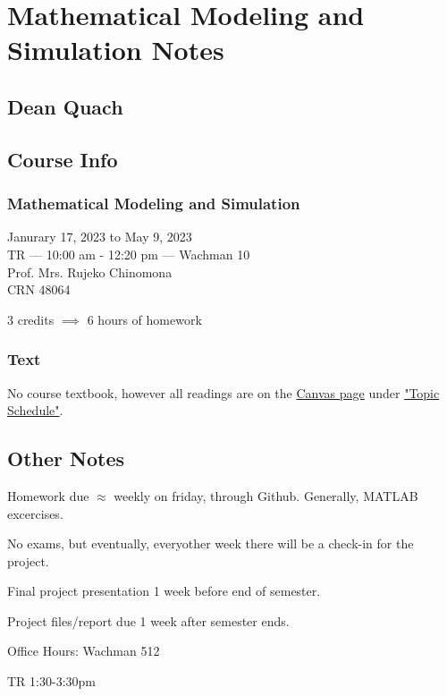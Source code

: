 \documentclass[12pt]{book}
\begin{document}
\frontmatter
%
\chapter*{\Huge \center Mathematical Modeling and Simulation Notes}
\thispagestyle{empty}
\section*{\huge \center Dean Quach}



\newpage
\section*{\center \normalsize Course Info}
\subsection*{\center \normalsize Mathematical Modeling and Simulation}

\begin{center}
Janurary 17, 2023 to May 9, 2023\\
TR --- 10:00 am - 12:20 pm --- Wachman 10\\
Prof. Mrs. Rujeko Chinomona\\
CRN 48064

3 credits $\implies{}$ 6 hours of homework
\end{center}

\subsection*{\center \normalsize Text}
\begin{center}
No course textbook, however all readings are on the \href{https://templeu.instructure.com/courses/124350}{Canvas page} under \href{https://templeu.instructure.com/courses/124350/pages/topic-schedule}{"Topic Schedule"}.
\end{center}


\newpage
\section*{\center \normalsize Other Notes}
\begin{center}
Homework due $\approx$ weekly on friday, through Github. Generally, MATLAB excercises.

No exams, but eventually, everyother week there will be a check-in for the project.

Final project presentation 1 week before end of semester. 

Project files/report due 1 week after semester ends.\\
\end{center}
\vspace{50pt}
\begin{center}
Office Hours: Wachman 512

TR 1:30-3:30pm
\end{center}
\end{document}
